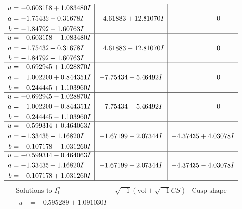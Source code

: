 \documentclass[1p]{elsarticle_modified}
\theoremstyle{definition}
\newcommand{\I}{\sqrt{-1}}
\begin{document}
$$\begin{array}{c|c|c}
\begin{aligned}
u &= -0.603158 + 1.083480 I \\
a &= -1.75432 - 0.31678 I \\
b &= -1.84792 - 1.60763 I\end{aligned}
 & \phantom{-}4.61883 + 12.81070 I & \phantom{-0.000000 } 0 \\ \hline\begin{aligned}
u &= -0.603158 - 1.083480 I \\
a &= -1.75432 + 0.31678 I \\
b &= -1.84792 + 1.60763 I\end{aligned}
 & \phantom{-}4.61883 - 12.81070 I & \phantom{-0.000000 } 0 \\ \hline\begin{aligned}
u &= -0.692945 + 1.028870 I \\
a &= \phantom{-}1.002200 + 0.844351 I \\
b &= \phantom{-}0.244445 + 1.103960 I\end{aligned}
 & -7.75434 + 5.46492 I & \phantom{-0.000000 } 0 \\ \hline\begin{aligned}
u &= -0.692945 - 1.028870 I \\
a &= \phantom{-}1.002200 - 0.844351 I \\
b &= \phantom{-}0.244445 - 1.103960 I\end{aligned}
 & -7.75434 - 5.46492 I & \phantom{-0.000000 } 0 \\ \hline\begin{aligned}
u &= -0.599314 + 0.464063 I \\
a &= -1.33435 - 1.16820 I \\
b &= -0.107178 - 1.031260 I\end{aligned}
 & -1.67199 - 2.07344 I & -4.37435 + 4.03078 I \\ \hline\begin{aligned}
u &= -0.599314 - 0.464063 I \\
a &= -1.33435 + 1.16820 I \\
b &= -0.107178 + 1.031260 I\end{aligned}
 & -1.67199 + 2.07344 I & -4.37435 - 4.03078 I\\
 \hline 
 \end{array}$$\newpage$$\begin{array}{c|c|c}  
\text{Solutions to }I^u_{1}& \I (\text{vol} + \sqrt{-1}CS) & \text{Cusp shape}\\
 \hline 
\begin{aligned}
u &= -0.595289 + 1.091030 I \\

\end{aligned}
\end{array}$$
\end{document}
